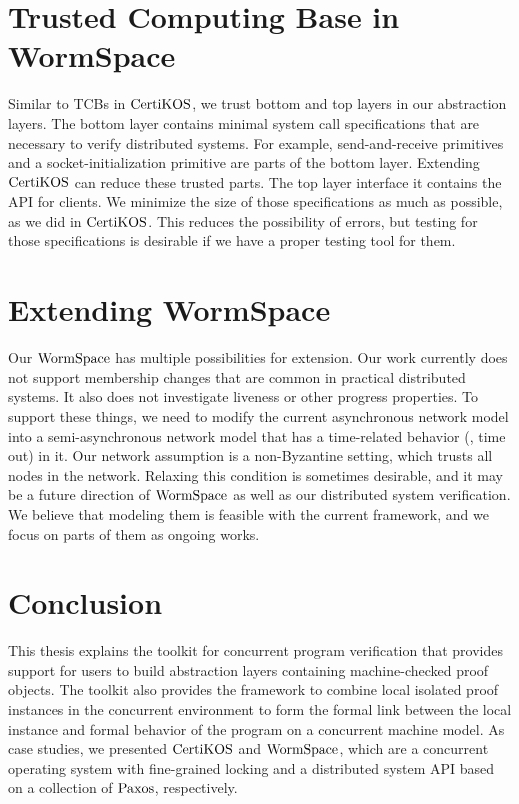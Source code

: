 \section{Trusted Computing Base in WormSpace}

Similar to TCBs in $\mathrm{CertiKOS}$, we trust bottom and top layers in our abstraction layers.
 The bottom layer contains minimal system call specifications that are necessary to verify distributed systems. 
 For example, send-and-receive primitives and a socket-initialization primitive are parts of the bottom layer. 
Extending $\mathrm{CertiKOS}$ can reduce these trusted parts. 
The top layer interface it contains the API for clients. 
We minimize the size of those specifications as much as possible, as we did in   $\mathrm{CertiKOS}$.
This reduces the possibility of errors, but testing for those specifications is desirable if we have a proper testing tool for them.

\section{Extending WormSpace}

Our $\mathrm{WormSpace}$ has multiple possibilities for extension. Our work currently does not support membership changes 
that are common in practical distributed systems. It also does not investigate liveness or other progress properties. 
To support these things, we need to modify the current asynchronous network model into a semi-asynchronous 
network model that has a time-related behavior (\ie, time out) in it. 
Our network assumption is a non-Byzantine setting, which trusts all nodes in the network. Relaxing this condition is sometimes desirable,
 and it may be a future direction of  $\mathrm{WormSpace}$ as well as our distributed system verification. 
 We believe that modeling them is feasible with the current framework, and we focus on parts of them as ongoing works.
 
 
\section{Conclusion}

This thesis explains the toolkit for concurrent program verification that provides support for users to build abstraction layers containing 
machine-checked proof objects. The toolkit also provides the framework to combine local isolated proof instances in the concurrent environment 
to form the  formal link between the local instance and formal behavior of the program on a concurrent machine model. 
As case studies, we presented $\mathrm{CertiKOS}$ and $\mathrm{WormSpace}$, 
which are a concurrent operating system with fine-grained locking and a distributed system API based on a collection of $\mathrm{Paxos}$, respectively.


